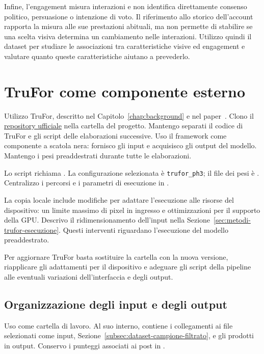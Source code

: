 Infine, l'engagement misura interazioni e non identifica direttamente consenso politico, persuasione o intenzione di voto. Il riferimento allo storico dell'account rapporta la misura alle sue prestazioni abituali, ma non permette di stabilire se una scelta visiva determina un cambiamento nelle interazioni. Utilizzo quindi il dataset per studiare le associazioni tra caratteristiche visive ed engagement e valutare quanto queste caratteristiche aiutano a prevederlo.

\section{TruFor come componente esterno}
\label{sec:materiali-trufor}

Utilizzo TruFor, descritto nel Capitolo~\ref{chap:background} e nel paper~\cite{Guillaro_2023_CVPR}. Clono il \href{https://github.com/grip-unina/TruFor}{repository ufficiale} nella cartella  del progetto. Mantengo separati il codice di TruFor e gli script delle elaborazioni successive. Uso il framework come componente a scatola nera: fornisco gli input e acquisisco gli output del modello. Mantengo i pesi preaddestrati durante tutte le elaborazioni.

Lo script  richiama . La configurazione selezionata è \texttt{trufor\_ph3}; il file dei pesi è . Centralizzo i percorsi e i parametri di esecuzione in .

La copia locale include modifiche per adattare l’esecuzione alle risorse del dispositivo: un limite massimo di pixel in ingresso e ottimizzazioni per il supporto della GPU. Descrivo il ridimensionamento dell'input nella Sezione~\ref{sec:metodi-trufor-esecuzione}. Questi interventi riguardano l'esecuzione del modello preaddestrato. 

Per aggiornare TruFor basta sostituire la cartella  con la nuova versione, riapplicare gli adattamenti per il dispositivo e adeguare gli script della pipeline alle eventuali variazioni dell’interfaccia e degli output.

\subsection{Organizzazione degli input e degli output}
\label{subsec:materiali-trufor-output}

Uso  come cartella di lavoro. Al suo interno,  contiene i collegamenti ai file selezionati come input, Sezione~\ref{subsec:dataset-campione-filtrato}, e gli  prodotti in output. Conservo i punteggi associati ai post in .

